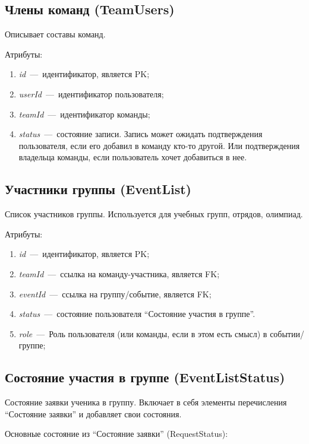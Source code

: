 \documentclass[14pt]{article}
\begin{document}
\subsection{Члены команд (TeamUsers)}

Описывает составы команд.

Атрибуты:
\begin{enumerate}
	\item \emph{id}~---~идентификатор, является PK; 
	\item \emph{userId}~---~идентификатор пользователя;
	\item \emph{teamId}~---~идентификатор команды;
	\item \emph{status}~---~состояние записи. Запись может ожидать подтверждения пользователя, если его добавил в команду кто-то другой. Или подтверждения владельца команды, если пользователь хочет добавиться в нее.
\end{enumerate}

\subsection{Участники группы (EventList)}

Список участников группы. Используется для учебных групп, отрядов, олимпиад.

Атрибуты:
\begin{enumerate}
	\item \emph{id}~---~идентификатор, является PK; 
	\item \emph{teamId}~---~ссылка на команду-участника, является FK;
	\item \emph{eventId}~---~ссылка на группу/событие, является FK;
	\item \emph{status}~---~состояние пользователя ``Состояние участия в группе''.
    \item \emph{role}~---~Роль пользователя (или команды, если в этом есть смысл) в событии/группе;
\end{enumerate}

\subsection{Состояние участия в группе (EventListStatus)}

Состояние заявки ученика в группу. Включает в себя элементы перечисления ``Состояние заявки'' и добавляет свои состояния.

Основные состояние из ``Состояние заявки'' (RequestStatus):
\end{document}
